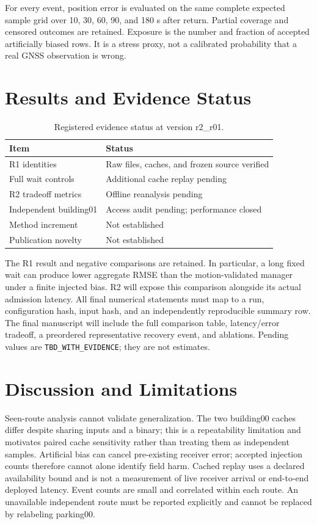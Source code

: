\documentclass[conference]{IEEEtran}
\begin{document}
For every event, position error is evaluated on the same complete expected sample grid over 10, 30, 60, 90, and 180 s after return. Partial coverage and censored outcomes are retained. Exposure is the number and fraction of accepted artificially biased rows. It is a stress proxy, not a calibrated probability that a real GNSS observation is wrong.

\section{Results and Evidence Status}
\begin{table}[t]\centering\small
\caption{Registered evidence status at version r2\_r01.}
\begin{tabular}{lp{45mm}}\toprule
Item & Status\\\midrule
R1 identities & Raw files, caches, and frozen source verified\\
Full wait controls & Additional cache replay pending\\
R2 tradeoff metrics & Offline reanalysis pending\\
Independent building01 & Access audit pending; performance closed\\
Method increment & Not established\\
Publication novelty & Not established\\\bottomrule
\end{tabular}\end{table}
The R1 result and negative comparisons are retained. In particular, a long fixed wait can produce lower aggregate RMSE than the motion-validated manager under a finite injected bias. R2 will expose this comparison alongside its actual admission latency. All final numerical statements must map to a run, configuration hash, input hash, and an independently reproducible summary row. The final manuscript will include the full comparison table, latency/error tradeoff, a preordered representative recovery event, and ablations. Pending values are \texttt{TBD\_WITH\_EVIDENCE}; they are not estimates.

\section{Discussion and Limitations}
Seen-route analysis cannot validate generalization. The two building00 caches differ despite sharing inputs and a binary; this is a repeatability limitation and motivates paired cache sensitivity rather than treating them as independent samples. Artificial bias can cancel pre-existing receiver error; accepted injection counts therefore cannot alone identify field harm. Cached replay uses a declared availability bound and is not a measurement of live receiver arrival or end-to-end deployed latency. Event counts are small and correlated within each route. An unavailable independent route must be reported explicitly and cannot be replaced by relabeling parking00.
\end{document}
